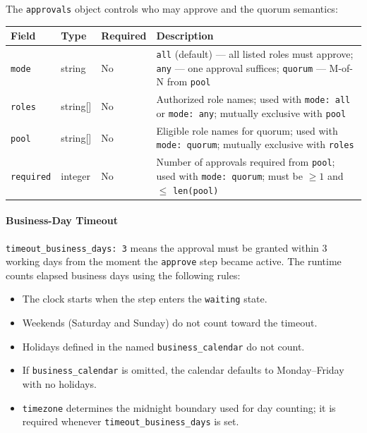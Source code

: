 The \texttt{approvals} object controls who may approve and the quorum semantics:

\begin{center}
\begin{tabular}{lllp{4.8cm}}
\hline
\textbf{Field} & \textbf{Type} & \textbf{Required} & \textbf{Description} \\
\hline
\texttt{mode}     & string   & No  & \texttt{all} (default) --- all listed roles must approve; \texttt{any} --- one approval suffices; \texttt{quorum} --- M-of-N from \texttt{pool} \\
\texttt{roles}    & string[] & No  & Authorized role names; used with \texttt{mode: all} or \texttt{mode: any}; mutually exclusive with \texttt{pool} \\
\texttt{pool}     & string[] & No  & Eligible role names for quorum; used with \texttt{mode: quorum}; mutually exclusive with \texttt{roles} \\
\texttt{required} & integer  & No  & Number of approvals required from \texttt{pool}; used with \texttt{mode: quorum}; must be $\geq 1$ and $\leq$ \texttt{len(pool)} \\
\hline
\end{tabular}
\end{center}

\paragraph{Business-Day Timeout}

\texttt{timeout\_business\_days: 3} means the approval must be granted within
3 working days from the moment the \texttt{approve} step became active.  The
runtime counts elapsed business days using the following rules:

\begin{itemize}
  \item The clock starts when the step enters the \texttt{waiting} state.
  \item Weekends (Saturday and Sunday) do not count toward the timeout.
  \item Holidays defined in the named \texttt{business\_calendar} do not count.
  \item If \texttt{business\_calendar} is omitted, the calendar defaults to
        Monday--Friday with no holidays.
  \item \texttt{timezone} determines the midnight boundary used for day counting;
        it is required whenever \texttt{timeout\_business\_days} is set.
\end{itemize}

